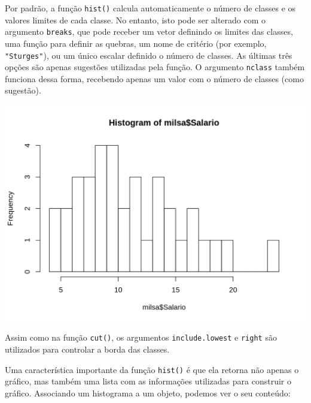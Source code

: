 \documentclass[10pt,a4paper]{book}
\newenvironment{Shaded}{\begin{snugshade}}{\end{snugshade}}
\newcommand{\KeywordTok}[1]{\textcolor[rgb]{0.13,0.29,0.53}{\textbf{#1}}}
\newcommand{\DataTypeTok}[1]{\textcolor[rgb]{0.13,0.29,0.53}{#1}}
\newcommand{\DecValTok}[1]{\textcolor[rgb]{0.00,0.00,0.81}{#1}}
\newcommand{\StringTok}[1]{\textcolor[rgb]{0.31,0.60,0.02}{#1}}
\newcommand{\OperatorTok}[1]{\textcolor[rgb]{0.81,0.36,0.00}{\textbf{#1}}}
\newcommand{\NormalTok}[1]{#1}
\begin{document}
Por padrão, a função \texttt{hist()} calcula automaticamente o número de
classes e os valores limites de cada classe. No entanto, isto pode ser
alterado com o argumento \texttt{breaks}, que pode receber um vetor
definindo os limites das classes, uma função para definir as quebras, um
nome de critério (por exemplo, \texttt{"Sturges"}), ou um único escalar
definido o número de classes. As últimas três opções são apenas
sugestões utilizadas pela função. O argumento \texttt{nclass} também
funciona dessa forma, recebendo apenas um valor com o número de classes
(como sugestão).

\begin{Shaded}
\end{Shaded}

\begin{center}\includegraphics{figures/unnamed-chunk-310-1} \end{center}

Assim como na função \texttt{cut()}, os argumentos
\texttt{include.lowest} e \texttt{right} são utilizados para controlar a
borda das classes.

Uma característica importante da função \texttt{hist()} é que ela
retorna não apenas o gráfico, mas também uma lista com as informações
utilizadas para construir o gráfico. Associando um histograma a um
objeto, podemos ver o seu conteúdo:

\begin{Shaded}
\end{Shaded}
\end{document}
